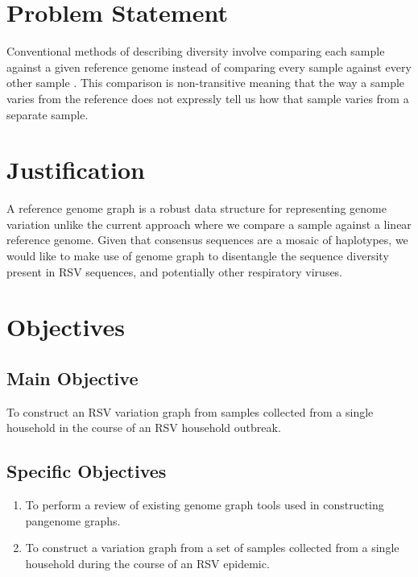 \documentclass[11pt]{article}
\begin{document}
\section{Problem Statement}
\label{sec:orgddd5a1f}
Conventional methods of describing diversity involve comparing each sample
against a given reference genome instead of comparing every sample against every
other sample \cite{patenGenomeGraphsEvolution2017}. This comparison is
non-transitive meaning that the way a sample varies from the reference does not
expressly tell us how that sample varies from a separate sample. 
\section{Justification}
\label{sec:org4b1f6c6}
A reference genome graph is a robust data structure for representing genome
variation unlike the current approach where we compare a sample against a
linear reference genome. Given that consensus sequences are a mosaic of
haplotypes, we would like to make use of genome graph to disentangle the
sequence diversity present in RSV sequences, and potentially other respiratory
viruses. 
\section{Objectives}
\label{sec:orgb1a433e}
\subsection{Main Objective}
\label{sec:org269e4c4}
To construct an RSV variation graph from samples collected from a single
household in the course of an RSV household outbreak.
\subsection{Specific Objectives}
\label{sec:org7f7b06c}
\begin{enumerate}
\item To perform a review of existing genome graph tools used in constructing pangenome graphs.
\item To construct a variation graph from a set of samples collected from a single
household during the course of an RSV epidemic.
\end{enumerate}
\end{document}

